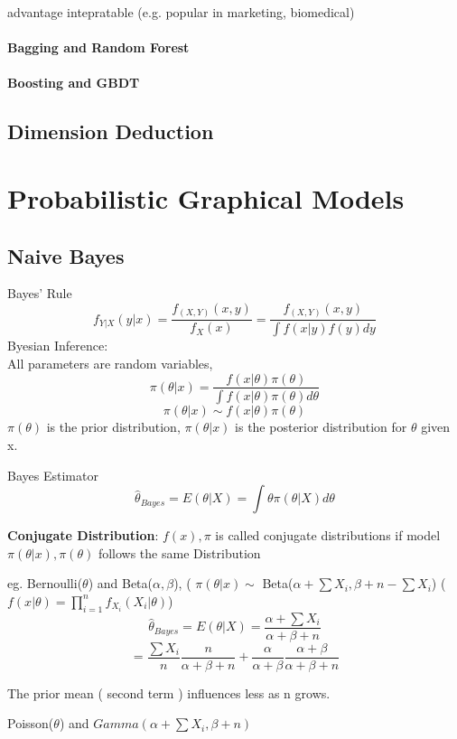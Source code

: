 \documentclass[11pt, openany]{book}              %
\begin{document}
advantage intepratable (e.g. popular in marketing, biomedical)

\subsection{Bagging and Random Forest}
\subsection{Boosting and GBDT}

\chapter{Dimension Deduction}


\part{Probabilistic Graphical Models}

\chapter{Naive Bayes}

Bayes' Rule 
$$ f_{Y|X}(y|x) = \frac{f_{(X,Y)}(x,y)}{f_X(x)} = \frac{f_{(X,Y)}(x,y)}{\int f(x|y)f(y)dy}$$
Byesian Inference:\\
All parameters are random variables,
$$\pi(\theta|x) =  \frac{f(x|\theta) \pi(\theta)}{\int f(x|\theta)\pi(\theta)d\theta}$$
$$\pi(\theta|x) \sim  f(x|\theta) \pi(\theta)$$
$\pi(\theta)$ is the prior distribution, $\pi(\theta|x)$ is the posterior distribution for $\theta$ given x. 

Bayes Estimator
$$\hat{\theta}_{Bayes} = E(\theta | X) = \int \theta \pi(\theta |X ) d\theta$$

\textbf{Conjugate Distribution}:
$f(x), \pi$ is called conjugate distributions if model $\pi(\theta|x), \pi(\theta)$ follows the same Distribution

eg. Bernoulli($\theta$) and Beta($\alpha,\beta$),  ( $\pi(\theta|x) \sim$ Beta($\alpha+\sum X_i, \beta + n - \sum X_i$) ($f(x|\theta) = \prod_{i=1}^n f_{X_i}(X_i|\theta)$)
$$\hat{\theta}_{Bayes} = E(\theta | X) = \frac{ \alpha + \sum X_i}{ \alpha + \beta + n} $$
$$= \frac{\sum X_i}{n}\frac{n}{\alpha + \beta + n} + \frac{\alpha}{\alpha + \beta}\frac{ \alpha + \beta}{\alpha + \beta + n}$$

The prior mean ( second term ) influences less as n grows.

Poisson($\theta$) and $Gamma(\alpha + \sum X_i, \beta + n )$ 
\end{document}
